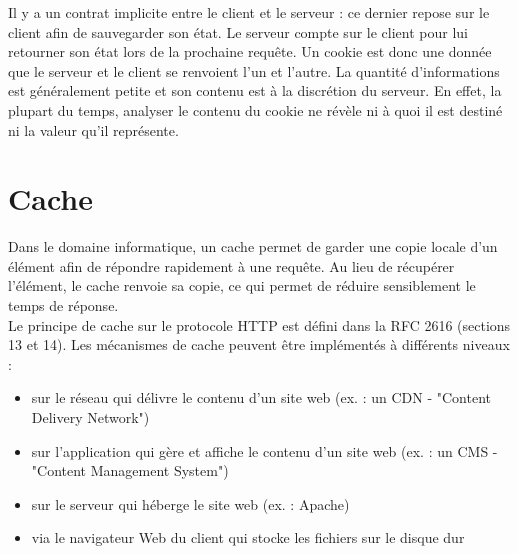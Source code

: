 Il y a un contrat implicite entre le client et le serveur : ce dernier repose sur le client afin de sauvegarder son état. Le serveur compte sur le client pour lui retourner son état lors de la prochaine requête. Un cookie est donc une donnée que le serveur et le client se renvoient l'un et l'autre. La quantité d'informations est généralement petite et son contenu est à la discrétion du serveur. En effet, la plupart du temps, analyser le contenu du cookie ne révèle ni à quoi il est destiné ni la valeur qu'il représente.


\section{Cache}
Dans le domaine informatique, un cache permet de garder une copie locale d'un élément afin de répondre rapidement à une requête. Au lieu de récupérer l'élément, le cache renvoie sa copie, ce qui permet de réduire sensiblement le temps de réponse.\\
Le principe de cache sur le protocole HTTP est défini dans la RFC 2616 \cite{IETF_RFC2616} (sections 13 et 14). Les mécanismes de cache peuvent être implémentés à différents niveaux :
\begin{itemize}
  \item sur le réseau qui délivre le contenu d'un site web (ex. : un CDN - "Content Delivery Network")
  \item sur l'application qui gère et affiche le contenu d'un site web (ex. : un CMS - "Content Management System")
  \item sur le serveur qui héberge le site web (ex. : Apache)
  \item via le navigateur Web du client qui stocke les fichiers sur le disque dur
  \newline
\end{itemize}

